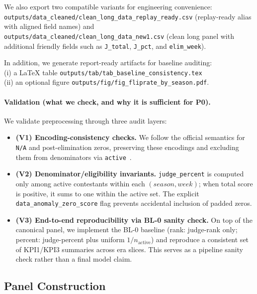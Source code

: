 We also export two compatible variants for engineering convenience:\\
\texttt{outputs/data\_cleaned/clean\_long\_data\_replay\_ready.csv} (replay-ready alias with aligned field names) and
\texttt{outputs/data\_cleaned/clean\_long\_data\_new1.csv} (clean long panel with additional friendly fields such as
\texttt{J\_total}, \texttt{J\_pct}, and \texttt{elim\_week}).

In addition, we generate report-ready artifacts for baseline auditing:\\
(i) a \LaTeX{} table \texttt{outputs/tab/tab\_baseline\_consistency.tex}\\
(ii) an optional figure \texttt{outputs/fig/fig\_fliprate\_by\_season.pdf}.


\paragraph{Validation (what we check, and why it is sufficient for P0).}
We validate preprocessing through three audit layers:
\begin{itemize}
  \item \textbf{(V1) Encoding-consistency checks.}
  We follow the official semantics for \texttt{N/A} and post-elimination zeros, preserving these encodings and excluding them
  from denominators via \texttt{active}~\cite{comap2026_problemC_pdf}.

  \item \textbf{(V2) Denominator/eligibility invariants.}
  \texttt{judge\_percent} is computed only among active contestants within each $(season, week)$; when total score is positive,
  it sums to one within the active set. The explicit \texttt{data\_anomaly\_zero\_score} flag prevents accidental inclusion of padded zeros.

  \item \textbf{(V3) End-to-end reproducibility via BL-0 sanity check.}
  On top of the canonical panel, we implement the BL-0 baseline (rank: judge-rank only; percent: judge-percent plus uniform
  $1/n_{\text{active}}$) and reproduce a consistent set of KPI1/KPI3 summaries across era slices.
  This serves as a pipeline sanity check rather than a final model claim.
\end{itemize}



\subsection{Panel Construction}
\label{subsec:panel_construction}

